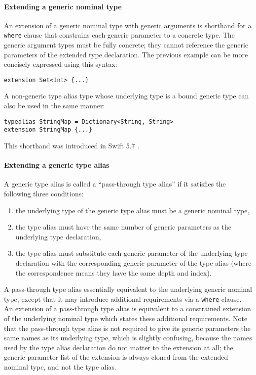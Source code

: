 \documentclass[../generics]{subfiles}
\begin{document}
\paragraph{Extending a generic nominal type} An extension of a generic nominal type with generic arguments is shorthand for a \texttt{where} clause that constrains each generic parameter to a concrete type. The generic argument types must be fully concrete; they cannot reference the generic parameters of the extended type declaration. The previous example can be more concisely expressed using this syntax:
\begin{Verbatim}
extension Set<Int> {...}
\end{Verbatim}
A non-generic type alias type whose underlying type is a bound generic type can also be used in the same manner:
\begin{Verbatim}
typealias StringMap = Dictionary<String, String>
extension StringMap {...}
\end{Verbatim}
This shorthand was introduced in Swift 5.7 \cite{se0361}.

\paragraph{Extending a generic type alias}
A generic type alias is called a ``pass-through type alias'' if it satisfies the following three conditions:
\begin{enumerate}
\item the underlying type of the generic type alias must be a generic nominal type,
\item the type alias must have the same number of generic parameters as the underlying type declaration,
\item the type alias must substitute each generic parameter of the underlying type declaration with the corresponding generic parameter of the type alias (where the correspondence means they have the same depth and index).
\end{enumerate}
A pass-through type alias essentially equivalent to the underlying generic nominal type, except that it may introduce additional requirements via a \texttt{where} clause. An extension of a pass-through type alias is equivalent to a constrained extension of the underlying nominal type which states these additional requirements. Note that the pass-through type alias is not required to give its generic parameters the same names as its underlying type, which is slightly confusing, because the names used by the type alias declaration do not matter to the extension at all; the generic parameter list of the extension is always cloned from the extended nominal type, and not the type alias.
\end{document}
